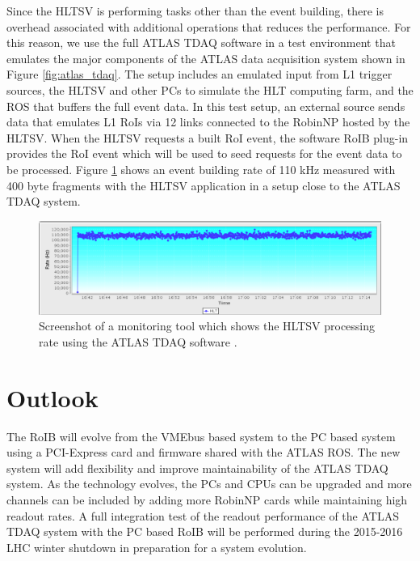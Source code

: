 Since the HLTSV is performing tasks other than the event building, there is overhead associated with additional operations 
that reduces the performance. For this reason, we use the full ATLAS TDAQ software in a test environment that emulates the major components of the ATLAS data acquisition system shown in Figure \ref{fig:atlas_tdaq}. The setup includes an emulated input from L1 trigger sources, 
the HLTSV and other PCs to simulate the HLT computing farm, and the ROS that buffers the full event data. 
 In this test setup, an external source sends data that emulates L1 RoIs via 12 links connected to the 
RobinNP hosted by the HLTSV. When the HLTSV requests a built RoI event, the software RoIB plug-in provides the RoI event which will be used 
to seed requests for the event data to be processed.
 Figure \ref{fig:partition} shows an event building rate of 110 kHz measured with 400 byte fragments with the HLTSV application in a setup close to the ATLAS TDAQ system. 

\begin{figure}[tbp] %
\centering
\includegraphics[width=.98\textwidth]{12ch.png}
\caption{Screenshot of a monitoring tool which shows the HLTSV processing rate using the ATLAS TDAQ software .}
\label{fig:partition}
\end{figure}


\section{Outlook}\label{sec:outlook}

The RoIB will evolve from the VMEbus based system to the PC based system using a PCI-Express card and firmware shared with the 
ATLAS ROS. The new system will add flexibility and improve maintainability of the ATLAS TDAQ system. As the technology 
evolves, the PCs and CPUs can be upgraded and more channels can be included by adding more RobinNP cards while maintaining high 
readout rates. A full integration test of the readout performance of the ATLAS TDAQ system with the PC based RoIB will be performed 
during the 2015-2016 LHC winter shutdown in preparation for a system evolution.



